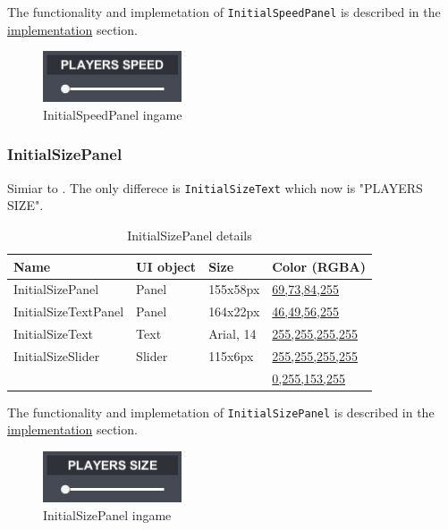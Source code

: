 \noindent The functionality and implemetation of \verb|InitialSpeedPanel| is described in the \hyperref[gui-implementation]{implementation} section.

\begin{figure}[h!]\centering
	\includegraphics[scale=1, frame]{gui-imgs/initialspeedpanel}
	\caption{InitialSpeedPanel ingame}
\end{figure}

\subsubsection{InitialSizePanel}\label{gui-initialsizepanel}
\noindent Simiar to . The only differece is \verb|InitialSizeText| which now is "PLAYERS SIZE".

\begin{table}[h!]\centering
	\caption{InitialSizePanel details}
	\begin{tabular}{|C{4cm}|C{4cm}|C{4cm}|C{4cm}|}
		\hline
		\textbf{Name} & \textbf{UI object} & \textbf{Size} & \textbf{Color (RGBA)} \\\hline
		InitialSizePanel & Panel & 155x58px & \hyperref[gui-colors]{69,73,84,255} \\\hline
		InitialSizeTextPanel & Panel & 164x22px & \hyperref[gui-colors]{46,49,56,255} \\\hline
		InitialSizeText & Text & Arial, 14 & \hyperref[gui-colors]{255,255,255,255} \\\hline
		InitialSizeSlider & Slider & 115x6px & \hyperref[gui-colors]{255,255,255,255} \\
		& & & \hyperref[gui-colors]{0,255,153,255} \\\hline
	\end{tabular}
\end{table}

\noindent The functionality and implemetation of \verb|InitialSizePanel| is described in the \hyperref[gui-implementation]{implementation} section.

\begin{figure}[h!]\centering
	\includegraphics[scale=1, frame]{gui-imgs/initialsizepanel}
	\caption{InitialSizePanel ingame}
\end{figure}

